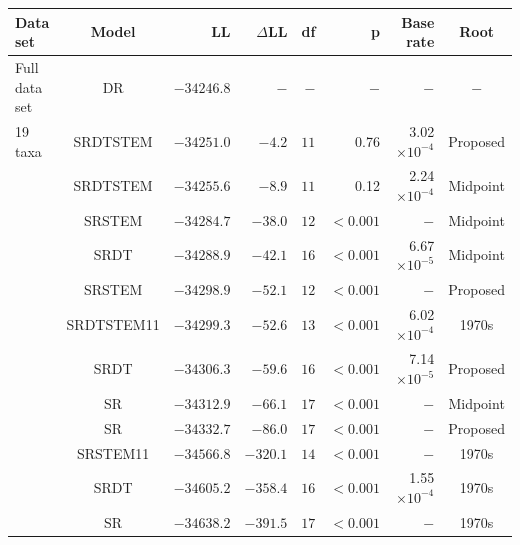
    \begin{tabular}{lcrrrrrc}
    Data set & Model & LL & $\Delta$LL & df & p & Base rate & Root  \\ 
\toprule
Full data set & DR & $−34246.8$ & $- $ & $- $ & $-$ & $-$ & $-$ \\ 
19 taxa & SRDTSTEM & $−34251.0$ & $−4.2 $ & $11 $ & 0.76 & 3.02$ \times 10^{-4}$ & Proposed \\ 
  & SRDTSTEM & $−34255.6$ & $−8.9 $ & $11 $ & 0.12 & 2.24$ \times 10^{-4}$ & Midpoint \\ 
  & SRSTEM & $−34284.7$ & $−38.0 $ & $12 $ & $<0.001$ & $-$ & Midpoint \\ 
  & SRDT & $−34288.9$ & $−42.1 $ & $16 $ & $<0.001$ & 6.67$ \times 10^{-5}$ & Midpoint \\ 
  & SRSTEM & $−34298.9$ & $−52.1 $ & $12 $ & $<0.001$ & $-$ & Proposed \\ 
  & SRDTSTEM11 & $−34299.3$ & $−52.6 $ & $13 $ & $<0.001$ & 6.02$ \times 10^{-4}$ & 1970s \\ 
  & SRDT & $−34306.3$ & $−59.6 $ & $16 $ & $<0.001$ & 7.14$ \times 10^{-5}$ & Proposed \\ 
  & SR & $−34312.9$ & $−66.1 $ & $17 $ & $<0.001$ & $-$ & Midpoint \\ 
  & SR & $−34332.7$ & $−86.0 $ & $17 $ & $<0.001$ & $-$ & Proposed \\ 
  & SRSTEM11 & $−34566.8$ & $−320.1 $ & $14 $ & $<0.001$ & $-$ & 1970s \\ 
  & SRDT & $−34605.2$ & $−358.4 $ & $16 $ & $<0.001$ & 1.55$ \times 10^{-4}$ & 1970s \\ 
  & SR & $−34638.2$ & $−391.5 $ & $17 $ & $<0.001$ & $-$ & 1970s \\ 
\bottomrule
\end{tabular}